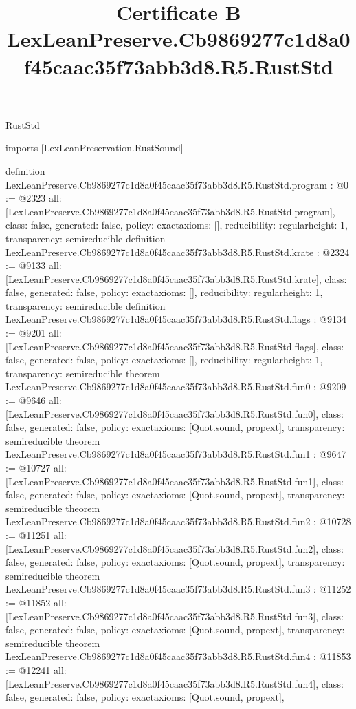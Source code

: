 \begin{lexlean}{RustStd}
\title{Certificate B LexLeanPreserve.Cb9869277c1d8a0f45caac35f73abb3d8.R5.RustStd}
\begin{coremodule}
imports [LexLeanPreservation.RustSound]

definition LexLeanPreserve.Cb9869277c1d8a0f45caac35f73abb3d8.R5.RustStd.program : @0 := @2323 {
  all: [LexLeanPreserve.Cb9869277c1d8a0f45caac35f73abb3d8.R5.RustStd.program],
  class: false,
  generated: false,
  policy: exact{axioms: []},
  reducibility: regular{height: 1},
  transparency: semireducible
}
definition LexLeanPreserve.Cb9869277c1d8a0f45caac35f73abb3d8.R5.RustStd.krate : @2324 := @9133 {
  all: [LexLeanPreserve.Cb9869277c1d8a0f45caac35f73abb3d8.R5.RustStd.krate],
  class: false,
  generated: false,
  policy: exact{axioms: []},
  reducibility: regular{height: 1},
  transparency: semireducible
}
definition LexLeanPreserve.Cb9869277c1d8a0f45caac35f73abb3d8.R5.RustStd.flags : @9134 := @9201 {
  all: [LexLeanPreserve.Cb9869277c1d8a0f45caac35f73abb3d8.R5.RustStd.flags],
  class: false,
  generated: false,
  policy: exact{axioms: []},
  reducibility: regular{height: 1},
  transparency: semireducible
}
theorem LexLeanPreserve.Cb9869277c1d8a0f45caac35f73abb3d8.R5.RustStd.fun0 : @9209 := @9646 {
  all: [LexLeanPreserve.Cb9869277c1d8a0f45caac35f73abb3d8.R5.RustStd.fun0],
  class: false,
  generated: false,
  policy: exact{axioms: [Quot.sound, propext]},
  transparency: semireducible
}
theorem LexLeanPreserve.Cb9869277c1d8a0f45caac35f73abb3d8.R5.RustStd.fun1 : @9647 := @10727 {
  all: [LexLeanPreserve.Cb9869277c1d8a0f45caac35f73abb3d8.R5.RustStd.fun1],
  class: false,
  generated: false,
  policy: exact{axioms: [Quot.sound, propext]},
  transparency: semireducible
}
theorem LexLeanPreserve.Cb9869277c1d8a0f45caac35f73abb3d8.R5.RustStd.fun2 : @10728 := @11251 {
  all: [LexLeanPreserve.Cb9869277c1d8a0f45caac35f73abb3d8.R5.RustStd.fun2],
  class: false,
  generated: false,
  policy: exact{axioms: [Quot.sound, propext]},
  transparency: semireducible
}
theorem LexLeanPreserve.Cb9869277c1d8a0f45caac35f73abb3d8.R5.RustStd.fun3 : @11252 := @11852 {
  all: [LexLeanPreserve.Cb9869277c1d8a0f45caac35f73abb3d8.R5.RustStd.fun3],
  class: false,
  generated: false,
  policy: exact{axioms: [Quot.sound, propext]},
  transparency: semireducible
}
theorem LexLeanPreserve.Cb9869277c1d8a0f45caac35f73abb3d8.R5.RustStd.fun4 : @11853 := @12241 {
  all: [LexLeanPreserve.Cb9869277c1d8a0f45caac35f73abb3d8.R5.RustStd.fun4],
  class: false,
  generated: false,
  policy: exact{axioms: [Quot.sound, propext]},
}
\end{coremodule}
\end{lexlean}
